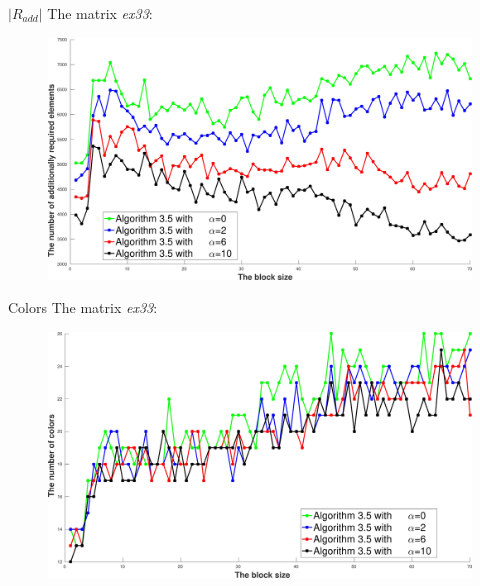 \documentclass{beamer}
\begin{document}
\begin{frame}{$|R_{add}|$}
The matrix \textit{ex33}:
\begin{figure}
\centering
\includegraphics[width=0.9\linewidth]{ex33_alg35_alpha_0_2_6_10_bls_lfo_adds}
\end{figure}
\end{frame}

\begin{frame}{Colors}
The matrix \textit{ex33}:

\begin{figure}
\centering
\includegraphics[width=0.9\linewidth]{ex33_alg35_alpha_0_2_6_10_bls_lfo_cols}
\end{figure}
\end{frame}
\end{document}

